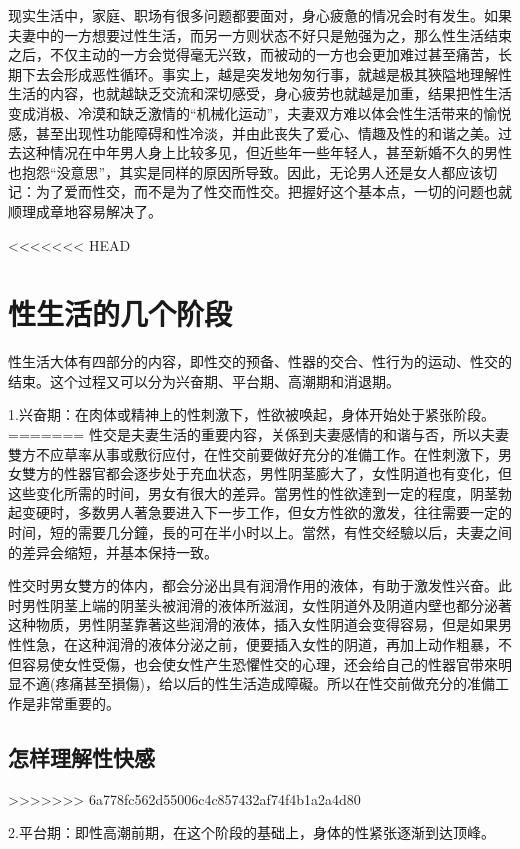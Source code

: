 \documentclass[12pt,UTF8]{ctexbook}
\begin{document}
现实生活中，家庭、职场有很多问题都要面对，身心疲惫的情况会时有发生。如果夫妻中的一方想要过性生活，而另一方则状态不好只是勉强为之，那么性生活结束之后，不仅主动的一方会觉得毫无兴致，而被动的一方也会更加难过甚至痛苦，长期下去会形成恶性循环。事实上，越是突发地匆匆行事，就越是极其狹隘地理解性生活的内容，也就越缺乏交流和深切感受，身心疲劳也就越是加重，结果把性生活变成消极、冷漠和缺乏激情的“机械化运动”，夫妻双方难以体会性生活带来的愉悦感，甚至出现性功能障碍和性冷淡，并由此丧失了爱心、情趣及性的和谐之美。过去这种情况在中年男人身上比较多见，但近些年一些年轻人，甚至新婚不久的男性也抱怨“没意思”，其实是同样的原因所导致。因此，无论男人还是女人都应该切记：为了爱而性交，而不是为了性交而性交。把握好这个基本点，一切的问题也就顺理成章地容易解决了。

<<<<<<< HEAD
\chapter{性生活的几个阶段}

性生活大体有四部分的内容，即性交的预备、性器的交合、性行为的运动、性交的结束。这个过程又可以分为兴奋期、平台期、高潮期和消退期。

1.兴奋期：在肉体或精神上的性刺激下，性欲被唤起，身体开始处于紧张阶段。
=======
性交是夫妻生活的重要内容，关係到夫妻感情的和谐与否，所以夫妻雙方不应草率从事或敷衍应付，在性交前要做好充分的准備工作。在性刺激下，男女雙方的性器官都会逐步处于充血状态，男性阴茎膨大了，女性阴道也有变化，但这些变化所需的时间，男女有很大的差异。當男性的性欲達到一定的程度，阴茎勃起变硬时，多数男人著急要进入下一步工作，但女方性欲的激发，往往需要一定的时间，短的需要几分鐘，長的可在半小时以上。當然，有性交经驗以后，夫妻之间的差异会缩短，并基本保持一致。

性交时男女雙方的体内，都会分泌出具有润滑作用的液体，有助于激发性兴奋。此时男性阴茎上端的阴茎头被润滑的液体所滋润，女性阴道外及阴道内壁也都分泌著这种物质，男性阴茎靠著这些润滑的液体，插入女性阴道会变得容易，但是如果男性性急，在这种润滑的液体分泌之前，便要插入女性的阴道，再加上动作粗暴，不但容易使女性受傷，也会使女性产生恐懼性交的心理，还会给自己的性器官带來明显不適(疼痛甚至損傷)，给以后的性生活造成障礙。所以在性交前做充分的准備工作是非常重要的。

\section{怎样理解性快感}
>>>>>>> 6a778fc562d55006c4c857432af74f4b1a2a4d80

2.平台期：即性高潮前期，在这个阶段的基础上，身体的性紧张逐渐到达顶峰。
\end{document}
